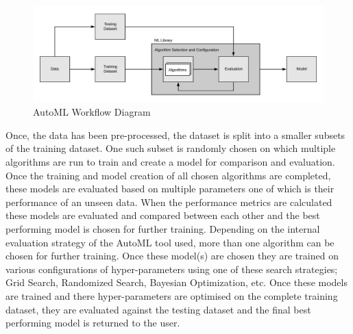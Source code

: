 \begin{figure}[t]
    \centering
    \includegraphics[width=16cm]{images/ML Workflow.jpeg}
    \caption{AutoML Workflow Diagram}
    \label{automl-workflow-diagram}
\end{figure}

Once, the data has been pre-processed, the dataset is split into a smaller subsets of the training dataset. One such subset is randomly chosen on which multiple algorithms are run to train and create a model for comparison and evaluation. Once the training and model creation of all chosen algorithms are completed, these models are evaluated based on multiple parameters one of which is their performance of an unseen data. When the performance metrics are calculated these models are evaluated and compared between each other and the best performing model is chosen for further training. Depending on the internal evaluation strategy of the AutoML tool used, more than one algorithm can be chosen for further training. Once these model(s) are chosen they are trained on various configurations of hyper-parameters using one of these search strategies; Grid Search, Randomized Search, Bayesian Optimization, etc. Once these models are trained and there hyper-parameters are optimised on the complete training dataset, they are evaluated against the testing dataset and the final best performing model is returned to the user.

